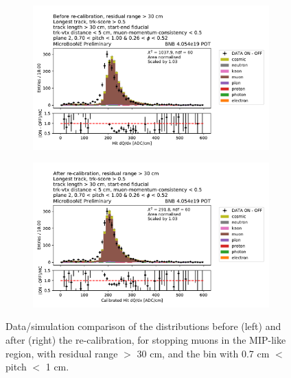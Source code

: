 \begin{figure}[H] 
\begin{center}
    \begin{subfigure}[b]{0.45\textwidth}
    \centering
    \includegraphics[width=1.00\textwidth]{stopping_muons_protons/070_pitch_100_026_phi_052apres.pdf}
    \end{subfigure}
    \begin{subfigure}[b]{0.45\textwidth}
    \centering
    \includegraphics[width=1.00\textwidth]{stopping_muons_protons/070_pitch_100_026_phi_052depois.pdf}
    \end{subfigure}
\caption{Data/simulation comparison of the \dqdx distributions before (left) and after (right) the re-calibration, for stopping muons in the MIP-like region, with residual range $>$ 30 cm, and the bin with 0.7 cm $<$ pitch $<$ 1 cm.}
\label{fig:stopping_muons_large_rr_high_pitch}
\end{center}
\end{figure}

